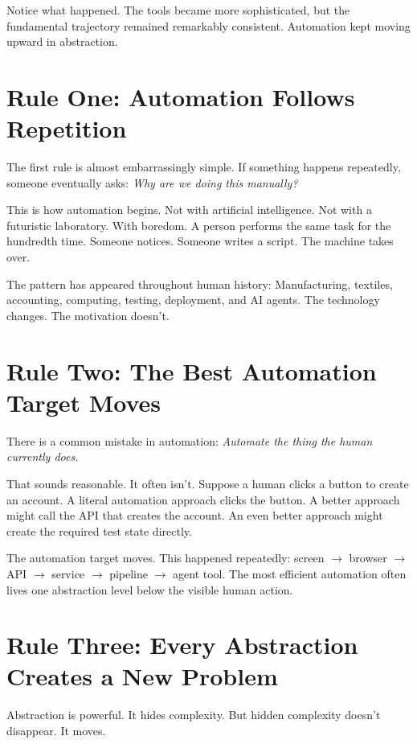 \documentclass[11pt,twoside]{book}
\begin{document}
Notice what happened. The tools became more sophisticated, but the fundamental trajectory remained remarkably consistent. Automation kept moving upward in abstraction.

\section*{Rule One: Automation Follows Repetition}

The first rule is almost embarrassingly simple. If something happens repeatedly, someone eventually asks: \emph{Why are we doing this manually?}

This is how automation begins. Not with artificial intelligence. Not with a futuristic laboratory. With boredom. A person performs the same task for the hundredth time. Someone notices. Someone writes a script. The machine takes over.

The pattern has appeared throughout human history: Manufacturing, textiles, accounting, computing, testing, deployment, and AI agents. The technology changes. The motivation doesn't.

\section*{Rule Two: The Best Automation Target Moves}

There is a common mistake in automation: \emph{Automate the thing the human currently does.}

That sounds reasonable. It often isn't. Suppose a human clicks a button to create an account. A literal automation approach clicks the button. A better approach might call the API that creates the account. An even better approach might create the required test state directly.

The automation target moves. This happened repeatedly: screen $\rightarrow$ browser $\rightarrow$ API $\rightarrow$ service $\rightarrow$ pipeline $\rightarrow$ agent tool. The most efficient automation often lives one abstraction level below the visible human action.

\section*{Rule Three: Every Abstraction Creates a New Problem}

Abstraction is powerful. It hides complexity. But hidden complexity doesn't disappear. It moves.
\end{document}

